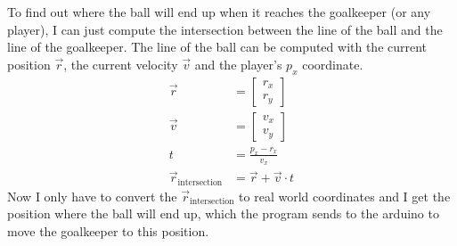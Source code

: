 To find out where the ball will end up when it reaches the goalkeeper (or any player), I can just compute the intersection between the line of the ball and the line of the goalkeeper.
The line of the ball can be computed with the current position $\vec{r}$, the current velocity $\vec{v}$ and the player's $p_x$ coordinate.
\begin{equation}
    \begin{split}
        \vec{r} &= \begin{bmatrix}
                       r_x \\
                       r_y
        \end{bmatrix}\\
        \vec{v} &= \begin{bmatrix}
                       v_x \\
                       v_y
        \end{bmatrix}\\
        t &= \frac{p_x - r_x}{v_x}\\
        \vec{r}_\text{intersection} &= \vec{r} + \vec{v} \cdot t
    \end{split}\label{eq:ball_intersection}
\end{equation}
Now I only have to convert the $\vec{r}_\text{intersection}$ to real world coordinates and I get the position where the ball will end up, which the program sends to the arduino to move the goalkeeper to this position.

%
%
%



